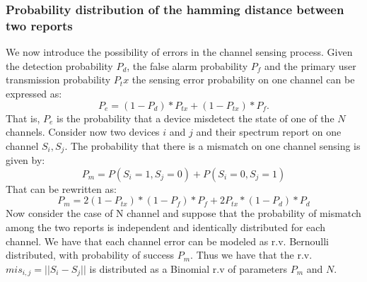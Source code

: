 \documentclass[letterpaper, 10 pt, conference]{ieeeconf}  %
\begin{document}
\subsubsection{Probability distribution of the hamming distance between two reports}
We now introduce the possibility of errors in the channel sensing process.
Given the detection probability $P_d$, the false alarm probability $P_f$ and the primary user transmission probability $P_tx$ the sensing error probability on one channel can be expressed as:
\begin{equation}
P_e=(1-P_d)*P_{tx}+(1-P_{tx})*P_f.
\end{equation}
That is, $P_e$ is the probability that a device misdetect the state of one of the $N$ channels. Consider now two devices $i$ and $j$ and their spectrum report on one channel $S_i,S_j$. The probability that there is a mismatch on one channel sensing is given by:
\begin{equation}
P_m=P(S_i=1,S_j=0)+P(S_i=0,S_j=1)
\end{equation}
That can be rewritten as:
\begin{equation}
P_m=2(1-P_{tx})*(1-P_f)*P_f +2P_{tx}*(1-P_d)*P_d
\end{equation}
Now consider the case of N channel and suppose that the probability of mismatch among the two reports is independent and identically distributed for each channel. We have that each channel error can be modeled as r.v. Bernoulli distributed, with probability of success $P_m$. Thus we have that the r.v. $mis_{i,j}=||S_i-S_j||$ is distributed as a Binomial r.v of parameters $P_m$ and $N$.
\end{document}
